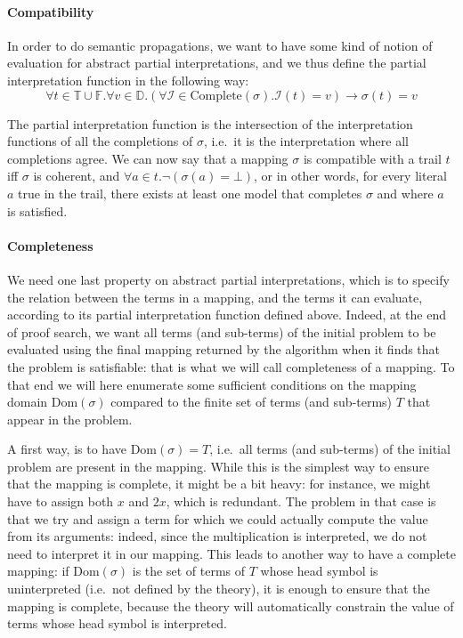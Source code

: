 \documentclass{article}
\begin{document}
\paragraph{Compatibility}
In order to do semantic propagations, we want to have some kind of notion
of evaluation for abstract partial interpretations, and we thus define the
partial interpretation function in the following way:
\[
  \forall t \in \mathbb{T} \cup \mathbb{F}. \forall v \in \mathbb{D}.
  \left(
    \forall \mathcal{I} \in \text{Complete}(\sigma).
    \mathcal{I}(t) = v
  \right) \rightarrow
    \sigma(t) = v
\]

The partial interpretation function is the intersection of the interpretation
functions of all the completions of $\sigma$, i.e.~it is the interpretation
where all completions agree. We can now say that a mapping $\sigma$ is compatible
with a trail $t$ iff $\sigma$ is coherent, and
$\forall a \in t. \neg (\sigma(a) = \bot)$, or in other words, for every literal $a$
true in the trail, there exists at least one model that completes $\sigma$ and where
$a$ is satisfied.

\paragraph{Completeness}
We need one last property on abstract partial interpretations, which is to
specify the relation between the terms in a mapping, and the terms it can evaluate,
according to its partial interpretation function defined above. Indeed, at the end
of proof search, we want all terms (and sub-terms) of the initial problem to be
evaluated using the final mapping returned by the algorithm when it finds that the
problem is satisfiable: that is what we will call completeness of a mapping.
To that end we will here enumerate some sufficient conditions on the mapping domain
$\text{Dom}(\sigma)$ compared to the finite set of terms (and sub-terms) $T$ that
appear in the problem.

A first way, is to have $\text{Dom}(\sigma) = T$, i.e.~all terms (and sub-terms) of the
initial problem are present in the mapping. While this is the simplest way to ensure that
the mapping is complete, it might be a bit heavy: for instance, we might have to assign
both $x$ and $2x$, which is redundant. The problem in that case is that we try and assign
a term for which we could actually compute the value from its arguments: indeed,
since the multiplication is interpreted, we do not need to interpret it in our mapping.
This leads to another way to have a complete mapping: if $\text{Dom}(\sigma)$ is the
set of terms of $T$ whose head symbol is uninterpreted (i.e.~not defined by the theory),
it is enough to ensure that the mapping is complete, because the theory will automatically
constrain the value of terms whose head symbol is interpreted.
\end{document}
